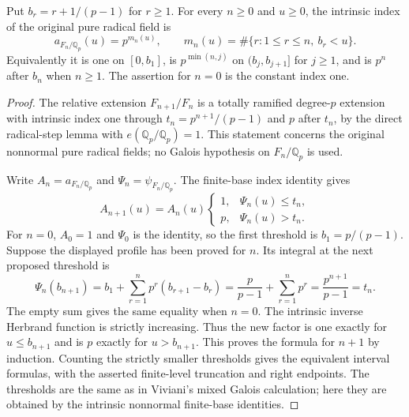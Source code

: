 \begin{lemma}
\label{ft:finite-radical-index-profile}
\leanok
{}
Put $b_r=r+1/(p-1)$ for $r\geq1$. For every $n\geq0$ and $u\geq0$,
the intrinsic index of the original pure radical field is
\[
 a_{F_n/\mathbb Q_p}(u)=p^{m_n(u)},\qquad
 m_n(u)=\#\{r:1\leq r\leq n,\ b_r<u\}.
\]
Equivalently it is one on $[0,b_1]$, is $p^{\min(n,j)}$ on
$(b_j,b_{j+1}]$ for $j\geq1$, and is $p^n$ after $b_n$ when $n\geq1$.
The assertion for $n=0$ is the constant index one.
\end{lemma}
\begin{proof}
The relative extension $F_{n+1}/F_n$ is a totally ramified degree-$p$
extension with intrinsic index one through
$t_n=p^{n+1}/(p-1)$ and $p$ after $t_n$, by the direct radical-step lemma
with $e(\mathbb Q_p/\mathbb Q_p)=1$. This statement concerns the original
nonnormal pure radical fields; no Galois hypothesis on $F_n/\mathbb Q_p$
is used.

Write $A_n=a_{F_n/\mathbb Q_p}$ and
$\Psi_n=\psi_{F_n/\mathbb Q_p}$. The finite-base index identity gives
\[
 A_{n+1}(u)=A_n(u)
 \begin{cases}
 1,&\Psi_n(u)\leq t_n,\\
 p,&\Psi_n(u)>t_n.
 \end{cases}
\]
For $n=0$, $A_0=1$ and $\Psi_0$ is the identity, so the first
threshold is $b_1=p/(p-1)$.
Suppose the displayed profile has been proved for $n$.
Its integral at the next proposed threshold is
\[
 \Psi_n(b_{n+1})
 =b_1+\sum_{r=1}^{n}p^r(b_{r+1}-b_r)
 =\frac p{p-1}+\sum_{r=1}^{n}p^r
 =\frac{p^{n+1}}{p-1}=t_n.
\]
The empty sum gives the same equality when $n=0$.
The intrinsic inverse Herbrand function is strictly increasing.
Thus the new factor is one exactly for $u\leq b_{n+1}$ and is $p$
exactly for $u>b_{n+1}$. This proves the formula for $n+1$ by induction.
Counting the strictly smaller thresholds gives the equivalent interval
formulas, with the asserted finite-level truncation and right endpoints.
The thresholds are the same as in Viviani's mixed Galois calculation;
here they are obtained by the intrinsic nonnormal finite-base identities.
\end{proof}

